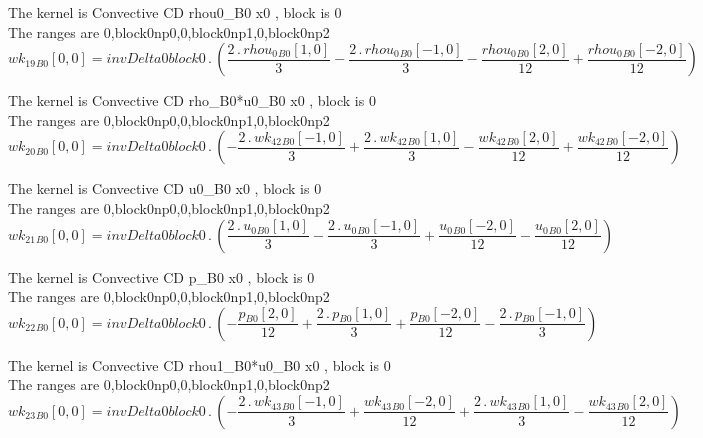 \documentclass{article}
\begin{document}
\noindent The kernel is Convective CD rhou0_B0 x0 , block is 0\\\noindent The ranges are 0,block0np0,0,block0np1,0,block0np2\\\begin{dmath}{wk_{19}{_{B0}}}[{0,0}] = invDelta0block0 \,.\, \left(\frac{2 \,.\, {rhou_{0}{_{B0}}}[{1,0}]}{3} - \frac{2 \,.\, {rhou_{0}{_{B0}}}[{-1,0}]}{3} - \frac{{rhou_{0}{_{B0}}}[{2,0}]}{12} + \frac{{rhou_{0}{_{B0}}}[{-2,0}]}{12}\right)\end{dmath}

\noindent The kernel is Convective CD rho_B0*u0_B0 x0 , block is 0\\\noindent The ranges are 0,block0np0,0,block0np1,0,block0np2\\\begin{dmath}{wk_{20}{_{B0}}}[{0,0}] = invDelta0block0 \,.\, \left(- \frac{2 \,.\, {wk_{42}{_{B0}}}[{-1,0}]}{3} + \frac{2 \,.\, {wk_{42}{_{B0}}}[{1,0}]}{3} - \frac{{wk_{42}{_{B0}}}[{2,0}]}{12} + \frac{{wk_{42}{_{B0}}}[{-2,0}]}{12}\right)\end{dmath}

\noindent The kernel is Convective CD u0_B0 x0 , block is 0\\\noindent The ranges are 0,block0np0,0,block0np1,0,block0np2\\\begin{dmath}{wk_{21}{_{B0}}}[{0,0}] = invDelta0block0 \,.\, \left(\frac{2 \,.\, {u_{0}{_{B0}}}[{1,0}]}{3} - \frac{2 \,.\, {u_{0}{_{B0}}}[{-1,0}]}{3} + \frac{{u_{0}{_{B0}}}[{-2,0}]}{12} - \frac{{u_{0}{_{B0}}}[{2,0}]}{12}\right)\end{dmath}

\noindent The kernel is Convective CD p_B0 x0 , block is 0\\\noindent The ranges are 0,block0np0,0,block0np1,0,block0np2\\\begin{dmath}{wk_{22}{_{B0}}}[{0,0}] = invDelta0block0 \,.\, \left(- \frac{{p{_{B0}}}[{2,0}]}{12} + \frac{2 \,.\, {p{_{B0}}}[{1,0}]}{3} + \frac{{p{_{B0}}}[{-2,0}]}{12} - \frac{2 \,.\, {p{_{B0}}}[{-1,0}]}{3}\right)\end{dmath}

\noindent The kernel is Convective CD rhou1_B0*u0_B0 x0 , block is 0\\\noindent The ranges are 0,block0np0,0,block0np1,0,block0np2\\\begin{dmath}{wk_{23}{_{B0}}}[{0,0}] = invDelta0block0 \,.\, \left(- \frac{2 \,.\, {wk_{43}{_{B0}}}[{-1,0}]}{3} + \frac{{wk_{43}{_{B0}}}[{-2,0}]}{12} + \frac{2 \,.\, {wk_{43}{_{B0}}}[{1,0}]}{3} - \frac{{wk_{43}{_{B0}}}[{2,0}]}{12}\right)\end{dmath}
\end{document}
